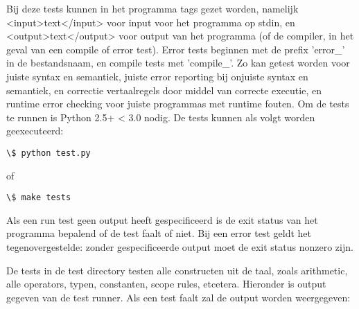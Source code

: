 \documentclass[]{article}
\begin{document}
Bij deze tests kunnen in het programma tags gezet worden, namelijk <input>text</input> voor input voor het programma op stdin, en <output>text</output> voor output van het programma (of de compiler, in het geval van een compile of error test). Error tests beginnen met de prefix 'error\_' in de bestandsnaam, en compile tests met 'compile\_'. Zo kan getest worden voor juiste syntax en semantiek, juiste error reporting bij onjuiste syntax en semantiek, en correctie vertaalregels door middel van correcte executie, en runtime error checking voor juiste programmas met runtime fouten. Om de tests te runnen is Python 2.5+ < 3.0 nodig. De tests kunnen als volgt worden geexecuteerd:

\begin{lstlisting}
\$ python test.py
\end{lstlisting}

of

\begin{lstlisting}
\$ make tests
\end{lstlisting}


Als een run test geen output heeft gespecificeerd is de exit status van het programma bepalend of de test faalt of niet. Bij een error test geldt het tegenovergestelde: zonder gespecificeerde output moet de exit status nonzero zijn.

De tests in de test directory testen alle constructen uit de taal, zoals arithmetic, alle operators, typen, constanten, scope rules, etcetera. Hieronder is output gegeven van de test runner. Als een test faalt zal de output worden weergegeven:
\end{document}
